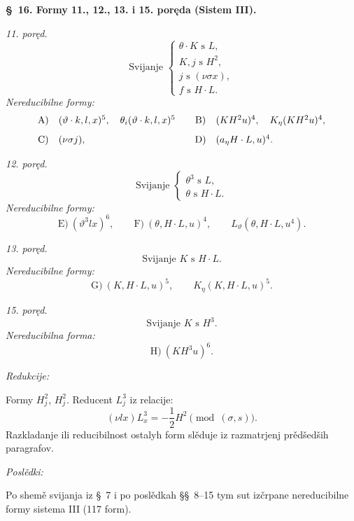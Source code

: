 \documentclass[11pt]{article}
\begin{document}
\begin{center}
\textbf{\S\ 16. \quad Formy 11., 12., 13. i 15. poręda (Sistem III).}
\end{center}

\noindent\textit{11. poręd.}
\[
\text{Svijanje }\left\{\begin{array}{l}
\theta\cdot K \text{ s }L,\\
K,j \text{ s }H^2,\\
j \text{ s }(\nu\sigma x),\\
f \text{ s }H\cdot L.
\end{array}\right.
\]
\noindent\textit{Nereducibilne formy:}
\[
\begin{array}{c@{\quad}l@{\qquad}c@{\quad}l}
\mathrm{A)}&(\vartheta\cdot k,l,x)^5,\quad
\theta_i(\vartheta\cdot k,l,x)^5&
\mathrm{B)}&(KH^2u)^4,\quad K_\eta(KH^2u)^4,\\[0.8em]
\mathrm{C)}&(\nu\sigma j),&
\mathrm{D)}&(a_\eta H\cdot L,u)^4.
\end{array}
\]

\noindent\textit{12. poręd.}
\[
\text{Svijanje }\left\{\begin{array}{l}
\theta^3 \text{ s }L,\\
\theta \text{ s }H\cdot L.
\end{array}\right.
\]
\noindent\textit{Nereducibilne formy:}
\[
\mathrm{E)}\ (\vartheta^3lx)^6,
\qquad
\mathrm{F)}\ (\theta,H\cdot L,u)^4,
\qquad L_\vartheta(\theta,H\cdot L,u^4).
\]

\noindent\textit{13. poręd.}
\[
\text{Svijanje }K\text{ s }H\cdot L.
\]
\noindent\textit{Nereducibilne formy:}
\[
\mathrm{G)}\ (K,H\cdot L,u)^5,
\qquad K_\eta(K,H\cdot L,u)^5.
\]

\noindent\textit{15. poręd.}
\[
\text{Svijanje }K\text{ s }H^3.
\]
\noindent\textit{Nereducibilna forma:}
\[
\mathrm{H)}\ (KH^3u)^6.
\]

\noindent\textit{Redukcije:}

Formy $H_j^2$, $H_j^2$. Reducent $L_j^3$ iz relacije:
\[
(\nu lx)L_x^3=-\frac12H^2\pmod{(\sigma,s)}.
\]
Razkladanje ili reducibilnost ostalyh form slěduje iz razmatrjenj prědšedših paragrafov.

\noindent\textit{Poslědki:}

Po shemě svijanja iz \S\ 7 i po poslědkah \S\S\ 8--15 tym sut izčrpane nereducibilne formy sistema III (117 form).
\end{document}
